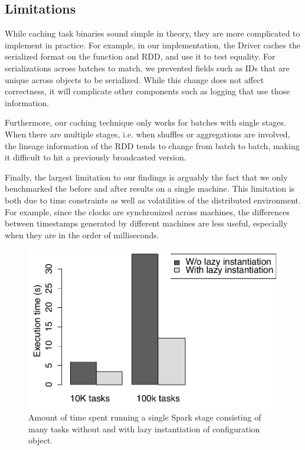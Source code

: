 \subsection{Limitations}
While caching task binaries sound simple in theory, they are more complicated to implement in practice. For example, in our implementation, the Driver caches the serialized format on the function and RDD, and use it to test equality. For serializations across batches to match, we prevented fields such as IDs that are unique across objects to be serialized. While this change does not affect correctness, it will complicate other components such as logging that use those information.

Furthermore, our caching technique only works for batches with single stages. When there are multiple stages, i.e. when shuffles or aggregations are involved, the lineage information of the RDD tends to change from batch to batch, making it difficult to hit a previously broadcasted version.

Finally, the largest limitation to our findings is arguably the fact that we only benchmarked the before and after results on a single machine. This limitation is both due to time constraints as well as volatilities of the distributed environment. For example, since the clocks are synchronized across machines, the differences between timestamps generated by different machines are less useful, especially when they are in the order of milliseconds.

\begin{figure}[t!]
 \begin{center}
   \includegraphics[scale=0.50]{images_graphs/optimizations/graph1/lazy_micro.pdf}
 \end{center}
 \caption{Amount of time spent running a single Spark stage consisting of many tasks without and with lazy instantiation of configuration object.}
 \label{fig:lazy_micro}
\end{figure}

